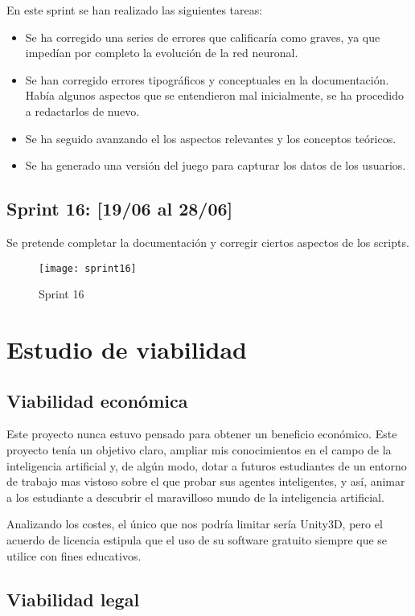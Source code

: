 En este sprint se han realizado las siguientes tareas: 
\begin{itemize}
    \item Se ha corregido una series de errores que calificaría como graves, ya que impedían por completo la evolución de la red neuronal.
    \item Se han corregido errores tipográficos y conceptuales en la documentación. Había algunos aspectos que se entendieron mal inicialmente, se ha procedido a redactarlos de nuevo.
    \item Se ha seguido avanzando el los aspectos relevantes y los conceptos teóricos.
    \item Se ha generado una versión del juego para capturar los datos de los usuarios.
\end{itemize}

\subsection{Sprint 16: [19/06 al 28/06]}

Se pretende completar la documentación y corregir ciertos aspectos de los scripts.

\begin{figure}[h!]
    \centering
    \texttt{[image: sprint16]}
    \caption{Sprint 16}
    \label{fig:s16}
\end{figure}


\section{Estudio de viabilidad}

\subsection{Viabilidad económica}
Este proyecto nunca estuvo pensado para obtener un beneficio económico. Este proyecto tenía un objetivo claro, ampliar mis conocimientos en el campo de la inteligencia artificial y, de algún modo, dotar a futuros estudiantes de un entorno de trabajo mas vistoso sobre el que probar sus agentes inteligentes, y así, animar a los estudiante a descubrir el maravilloso mundo de la inteligencia artificial.

Analizando los costes, el único que nos podría limitar sería Unity3D, pero el acuerdo de licencia estipula que el uso de su software gratuito siempre que se utilice con fines educativos.

\subsection{Viabilidad legal}

